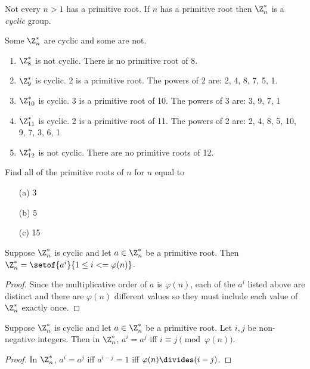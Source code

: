 \documentclass[oneside,12pt]{amsart}
\begin{document}
Not every $n>1$ has a primitive root. If $n$ has a primitive root then $\Z^*_n$ is a \emph{cyclic} group.

\begin{in_class_example} Some $\Z^*_n$ are cyclic and some are not.
\begin{enumerate}
\item $\Z^*_8$ is not cyclic. There is no primitive root of 8.
\item $\Z^*_9$ is cyclic. 2 is a primitive root. The powers of 2 are: 2, 4, 8, 7, 5, 1.
\item $\Z^*_{10}$ is cyclic. 3 is a primitive root of 10. The powers of 3 are: 3, 9, 7, 1
\item $\Z^*_{11}$ is cyclic. 2 is a primitive root of 11. The powers of 2 are: 2, 4, 8, 5, 10, 9, 7, 3, 6, 1
\item $\Z^*_{12}$ is not cyclic. There are no primitive roots of 12.
\end{enumerate}
\end{in_class_example}

\begin{homework}
Find all of the primitive roots of $n$ for $n$ equal to
\begin{enumerate}
\item[{(a)}] 3
\item[{(b)}] 5
\item[{(c})] 15
\end{enumerate}
\end{homework}

\begin{lemma}
Suppose $\Z^*_n$ is cyclic and let $a\in\Z^*_n$ be a primitive root. Then $\Z^*_n=\setof{a^i}{1\leq i <= \varphi(n)}$.
\end{lemma}
\begin{proof}
Since the multiplicative order of $a$ is $\varphi(n)$, each of the $a^i$ listed above are distinct and there are $\varphi(n)$ different values so they must include each value of $\Z^*_n$ exactly once.
\end{proof}

\begin{lemma}
Suppose $\Z^*_n$ is cyclic and let $a\in\Z^*_n$ be a primitive root. Let $i,j$ be non-negative integers. Then in $\Z^*_n$, $a^i=a^j$ iff $i\equiv j \pmod {\varphi(n)}$.
\end{lemma}
\begin{proof}
In $\Z^*_n$, $a^i=a^j$ iff $a^{i-j} = 1$ iff $\varphi(n) \divides (i-j)$.
\end{proof}
\end{document}
